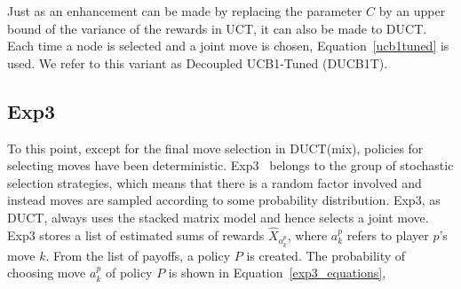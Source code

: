 \documentclass{article}
\begin{document}


Just as an enhancement can be made by replacing the parameter $C$ by an upper bound of the variance of the rewards in UCT, it can also be made to DUCT. Each time a node is selected and a joint move is chosen, Equation~\ref{ucb1tuned} is used. We refer to this variant as Decoupled UCB1-Tuned (DUCB1T).

\subsection{Exp3}
\label{subsec:exp3}

To this point, except for the final move selection in DUCT(mix), policies for selecting moves have been deterministic. Exp3~\cite{Exp3} belongs to the group of stochastic selection strategies, which means that there is a random factor involved and instead moves are sampled according to some probability distribution. %
Exp3, as DUCT, always uses the stacked matrix model and hence selects a joint move.
Exp3 stores a list of estimated sums of rewards $\hat{X}_{a^{p}_{k}}$, where $a^{p}_{k}$ refers to player $p$'s move $k$. From the list of payoffs, a policy $P$ is created. The probability of choosing move $a^{p}_{k}$ of policy $P$ is shown in Equation~\ref{exp3_equations}, 
\end{document}
